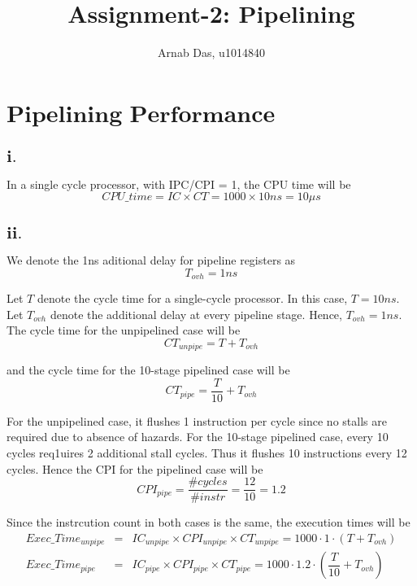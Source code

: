 \documentclass{tufte-handout}
\title{Assignment-2: Pipelining}
\author[]{Arnab Das, u1014840}
\begin{document}
  
  \maketitle%
  

 \setcounter{secnumdepth}{1}

\newpage
 \section{$\textbf{Pipelining Performance}$}
 	\subsection{$\textbf{i.}$} In a single cycle processor, with IPC/CPI = 1, the CPU time will be
	\[ CPU\_time = IC  \times CT = 1000 \times 10 ns = 10 \mu s\]
	
	
 	\subsection{$\textbf{ii.}$}
	We denote the 1ns aditional delay for pipeline registers as 
	\[
		T_{ovh} = 1ns
	\]

	Let $T$ denote the cycle time for a single-cycle processor. In this case, $T = 10 ns$. Let $T_{ovh}$ denote the additional delay at every pipeline stage. Hence, $T_{ovh}=1ns$. 
	The cycle time for the unpipelined case will be
	\[
		CT_{unpipe} = T + T_{ovh}
	\]

	and the cycle time for the 10-stage pipelined case will be
	\[
		CT_{pipe} = \dfrac{T}{10} + T_{ovh}
	\]

	For the unpipelined case, it flushes 1 instruction per cycle since no stalls are required due to absence of hazards. 
	For the 10-stage pipelined case, every 10 cycles req1uires 2 additional stall cycles. Thus it flushes 10 instructions every 12 cycles. Hence the CPI for the pipelined case will be
	\[
		CPI_{pipe} = \dfrac{\# cycles}{\# instr} = \dfrac{12}{10} = 1.2
	\]

	Since the instrcution count in both cases is the same, the execution times will be
	\begin{eqnarray*}
		Exec\_Time_{unpipe} &=& IC_{unpipe} \times CPI_{unpipe} \times CT_{unpipe} = 1000 \cdot 1 \cdot (T + T_{ovh}) \\
		Exec\_Time_{pipe} &=& IC_{pipe} \times CPI_{pipe} \times CT_{pipe} = 1000 \cdot 1.2 \cdot (\dfrac{T}{10} + T_{ovh}) 
	\end{eqnarray*}
\end{document}
